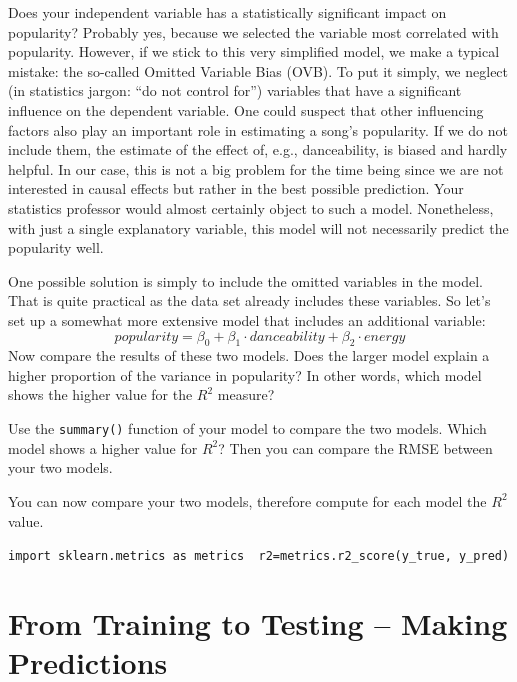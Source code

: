 \documentclass[
  11pt,
]{book}
\newenvironment{tips}[1]
  {
  \begin{itemize}
  \footnotesize
  \renewcommand{\labelitemi}{
    \raisebox{-.7\height}[0pt][0pt]{
      {\setkeys{Gin}{width=3em,keepaspectratio}
        \texttt{[image: images/\#1.png]}}
    }
  }
  \setlength{\fboxsep}{1em}
  \begin{rbox}
  \item
  }
  {
  \end{rbox}
  \end{itemize}
  }
\newenvironment{tipsp}[1]
  {
  \begin{itemize}
  \footnotesize
  \renewcommand{\labelitemi}{
    \raisebox{-.7\height}[0pt][0pt]{
      {\setkeys{Gin}{width=3em,keepaspectratio}
        \texttt{[image: images/\#1.png]}}
    }
  }
  \setlength{\fboxsep}{1em}
  \begin{pbox}
  \item
  }
  {
  \end{pbox}
  \end{itemize}
  }
\begin{document}
Does your independent variable has a statistically significant impact on popularity? Probably yes, because we selected the variable most correlated with popularity. However, if we stick to this very simplified model, we make a typical mistake: the so-called Omitted Variable Bias (OVB). To put it simply, we neglect (in statistics jargon: ``do not control for'') variables that have a significant influence on the dependent variable. One could suspect that other influencing factors also play an important role in estimating a song's popularity. If we do not include them, the estimate of the effect of, e.g., danceability, is biased and hardly helpful. In our case, this is not a big problem for the time being since we are not interested in causal effects but rather in the best possible prediction. Your statistics professor would almost certainly object to such a model. Nonetheless, with just a single explanatory variable, this model will not necessarily predict the popularity well.

One possible solution is simply to include the omitted variables in the model. That is quite practical as the data set already includes these variables. So let's set up a somewhat more extensive model that includes an additional variable:
\[popularity = \beta_0 + \beta_1 \cdot danceability + \beta_2 \cdot energy\]
Now compare the results of these two models. Does the larger model explain a higher proportion of the variance in popularity? In other words, which model shows the higher value for the \(R^2\) measure?

\begin{tips}r

Use the \texttt{summary()} function of your model to compare the two models. Which model shows a higher value for \(R^2\)? Then you can compare the RMSE between your two models.

\end{tips}

\begin{tipsp}p

You can now compare your two models, therefore compute for each model the \(R^2\) value.

\texttt{import\ sklearn.metrics\ as\ metrics\ \ r2=metrics.r2\_score(y\_true,\ y\_pred)}

\end{tipsp}

\hypertarget{from-training-to-testing-making-predictions}{%
\section{From Training to Testing -- Making Predictions}\label{from-training-to-testing-making-predictions}}
\end{document}
